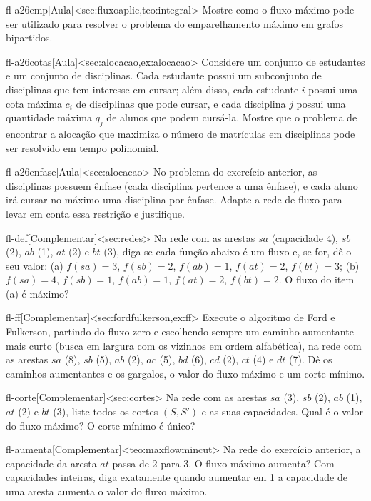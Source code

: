 \begin{exercicio}{fl-a26emp}[Aula]<sec:fluxoaplic,teo:integral>
Mostre como o fluxo máximo pode ser utilizado para resolver o problema do emparelhamento máximo em grafos bipartidos.
\end{exercicio}
\begin{exercicio}{fl-a26cotas}[Aula]<sec:alocacao,ex:alocacao>
Considere um conjunto de estudantes e um conjunto de disciplinas. Cada estudante possui um subconjunto de disciplinas que tem interesse em cursar; além disso, cada estudante $i$ possui uma cota máxima $c_i$ de disciplinas que pode cursar, e cada disciplina $j$ possui uma quantidade máxima $q_j$ de alunos que podem cursá-la. Mostre que o problema de encontrar a alocação que maximiza o número de matrículas em disciplinas pode ser resolvido em tempo polinomial.
\end{exercicio}
\begin{exercicio}{fl-a26enfase}[Aula]<sec:alocacao>
No problema do exercício anterior, as disciplinas possuem ênfase (cada disciplina pertence a uma ênfase), e cada aluno irá cursar no máximo uma disciplina por ênfase. Adapte a rede de fluxo para levar em conta essa restrição e justifique.
\end{exercicio}
\excompl
\begin{exercicio}{fl-def}[Complementar]<sec:redes>
Na rede com as arestas $sa$ (capacidade 4), $sb$ (2), $ab$ (1), $at$ (2) e $bt$ (3), diga se cada função abaixo é um fluxo e, se for, dê o seu valor: (a) $f(sa)=3$, $f(sb)=2$, $f(ab)=1$, $f(at)=2$, $f(bt)=3$; (b) $f(sa)=4$, $f(sb)=1$, $f(ab)=1$, $f(at)=2$, $f(bt)=2$. O fluxo do item (a) é máximo?
\end{exercicio}
\begin{exercicio}{fl-ff}[Complementar]<sec:fordfulkerson,ex:ff>
Execute o algoritmo de Ford e Fulkerson, partindo do fluxo zero e escolhendo sempre um caminho aumentante mais curto (busca em largura com os vizinhos em ordem alfabética), na rede com as arestas $sa$ (8), $sb$ (5), $ab$ (2), $ac$ (5), $bd$ (6), $cd$ (2), $ct$ (4) e $dt$ (7). Dê os caminhos aumentantes e os gargalos, o valor do fluxo máximo e um corte mínimo.
\end{exercicio}
\begin{exercicio}{fl-corte}[Complementar]<sec:cortes>
Na rede com as arestas $sa$ (3), $sb$ (2), $ab$ (1), $at$ (2) e $bt$ (3), liste todos os cortes $(S,S')$ e as suas capacidades. Qual é o valor do fluxo máximo? O corte mínimo é único?
\end{exercicio}
\begin{exercicio}{fl-aumenta}[Complementar]<teo:maxflowmincut>
Na rede do exercício anterior, a capacidade da aresta $at$ passa de 2 para 3. O fluxo máximo aumenta? Com capacidades inteiras, diga exatamente quando aumentar em 1 a capacidade de uma aresta aumenta o valor do fluxo máximo.
\end{exercicio}
